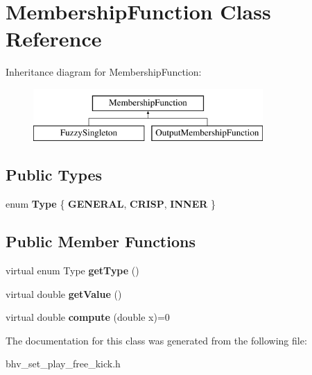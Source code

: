 \hypertarget{classMembershipFunction}{
\section{MembershipFunction Class Reference}
\label{classMembershipFunction}
}
Inheritance diagram for MembershipFunction:\begin{figure}[H]
\begin{center}
\leavevmode
\includegraphics[height=2.000000cm]{classMembershipFunction}
\end{center}
\end{figure}
\subsection*{Public Types}
\begin{DoxyCompactItemize}
\item 
enum {\bfseries Type} \{ {\bfseries GENERAL}, 
{\bfseries CRISP}, 
{\bfseries INNER}
 \}
\end{DoxyCompactItemize}
\subsection*{Public Member Functions}
\begin{DoxyCompactItemize}
\item 
\hypertarget{classMembershipFunction_ae13a0c2246ff6cf2eb9b15c53049d853}{
virtual enum Type {\bfseries getType} ()}
\label{classMembershipFunction_ae13a0c2246ff6cf2eb9b15c53049d853}

\item 
\hypertarget{classMembershipFunction_a31ad8dfe5b99b39e895c4859b3f0efe6}{
virtual double {\bfseries getValue} ()}
\label{classMembershipFunction_a31ad8dfe5b99b39e895c4859b3f0efe6}

\item 
\hypertarget{classMembershipFunction_a96febbf0f25e46dac86ec3fe8da7f14c}{
virtual double {\bfseries compute} (double x)=0}
\label{classMembershipFunction_a96febbf0f25e46dac86ec3fe8da7f14c}

\end{DoxyCompactItemize}


The documentation for this class was generated from the following file:\begin{DoxyCompactItemize}
\item 
bhv\_\-set\_\-play\_\-free\_\-kick.h\end{DoxyCompactItemize}
